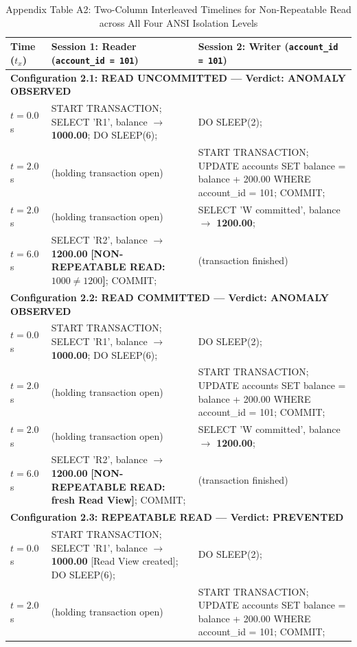 \documentclass[sigconf, pbalance, nonacm]{acmart}
\begin{document}
\begin{table}[p]
\centering
\small
\caption{Appendix Table A2: Two-Column Interleaved Timelines for Non-Repeatable Read across All Four ANSI Isolation Levels}
\label{tab:app_nonrep}
\begin{tabularx}{\textwidth}{p{1.8cm} X X}
\toprule
\textbf{Time ($t_x$)} & \textbf{Session 1: Reader (\texttt{account\_id = 101})} & \textbf{Session 2: Writer (\texttt{account\_id = 101})} \\
\midrule
\multicolumn{3}{l}{\textbf{Configuration 2.1: READ UNCOMMITTED --- Verdict: ANOMALY OBSERVED}} \\
$t = 0.0$s & START TRANSACTION; SELECT 'R1', balance $\rightarrow$ \textbf{1000.00}; DO SLEEP(6); & DO SLEEP(2); \\
$t = 2.0$s & (holding transaction open) & START TRANSACTION; UPDATE accounts SET balance = balance + 200.00 WHERE account\_id = 101; COMMIT; \\
$t = 2.0$s & (holding transaction open) & SELECT 'W committed', balance $\rightarrow$ \textbf{1200.00}; \\
$t = 6.0$s & SELECT 'R2', balance $\rightarrow$ \textbf{1200.00} \textbf{[NON-REPEATABLE READ: $1000 \ne 1200$]}; COMMIT; & (transaction finished) \\
\midrule
\multicolumn{3}{l}{\textbf{Configuration 2.2: READ COMMITTED --- Verdict: ANOMALY OBSERVED}} \\
$t = 0.0$s & START TRANSACTION; SELECT 'R1', balance $\rightarrow$ \textbf{1000.00}; DO SLEEP(6); & DO SLEEP(2); \\
$t = 2.0$s & (holding transaction open) & START TRANSACTION; UPDATE accounts SET balance = balance + 200.00 WHERE account\_id = 101; COMMIT; \\
$t = 2.0$s & (holding transaction open) & SELECT 'W committed', balance $\rightarrow$ \textbf{1200.00}; \\
$t = 6.0$s & SELECT 'R2', balance $\rightarrow$ \textbf{1200.00} \textbf{[NON-REPEATABLE READ: fresh Read View]}; COMMIT; & (transaction finished) \\
\midrule
\multicolumn{3}{l}{\textbf{Configuration 2.3: REPEATABLE READ --- Verdict: PREVENTED}} \\
$t = 0.0$s & START TRANSACTION; SELECT 'R1', balance $\rightarrow$ \textbf{1000.00} [Read View created]; DO SLEEP(6); & DO SLEEP(2); \\
$t = 2.0$s & (holding transaction open) & START TRANSACTION; UPDATE accounts SET balance = balance + 200.00 WHERE account\_id = 101; COMMIT; \\

\end{tabularx}
\end{table}
\end{document}
